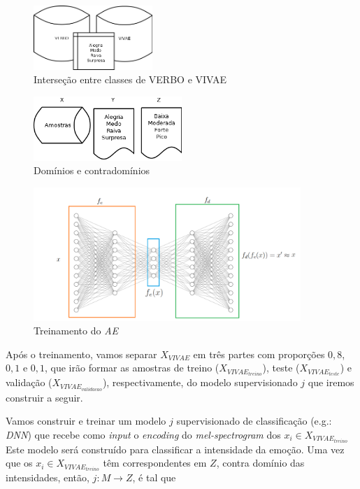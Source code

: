 \begin{figure}[!h]
\centering
\includegraphics[width=0.40\textwidth]{imagens/p-yverbointeryvivae.png}
\caption{\label{fig:yverbointeryvivae}Interseção entre classes de VERBO e VIVAE}
\end{figure}

\begin{figure}[!h]
\centering
\includegraphics[width=0.5\textwidth]{imagens/p-dominios-contradominos.png}
\caption{\label{fig:dominioscontradominios}Domínios e contradomínios}
\end{figure}

\begin{figure}[!h]
\centering
\includegraphics[width=0.9\textwidth]{imagens/p-autoencoder.png}
\caption{\label{fig:treinamentoae}Treinamento do \textit{AE}}
\end{figure}

Após o treinamento, vamos separar $X_{VIVAE}$ em três partes com proporções $0,8$, $0,1$ e $0,1$, que irão formar as amostras de treino ($X_{VIVAE_{treino}}$), teste ($X_{VIVAE_{teste}}$) e validação ($X_{VIVAE_{validacao}}$), respectivamente, do modelo supervisionado $j$ que iremos construir a seguir.

Vamos construir e treinar um modelo $j$ supervisionado de classificação (e.g.: \textit{DNN}) que recebe como \textit{input} o \textit{encoding} do \textit{mel-spectrogram} dos $x_i \in X_{VIVAE_{treino}}$ Este modelo será construído para classificar a intensidade da emoção. Uma vez que os $x_i \in X_{VIVAE_{treino}}$ têm correspondentes em $Z$, contra domínio das intensidades, então, $j: M \rightarrow Z$, é tal que

